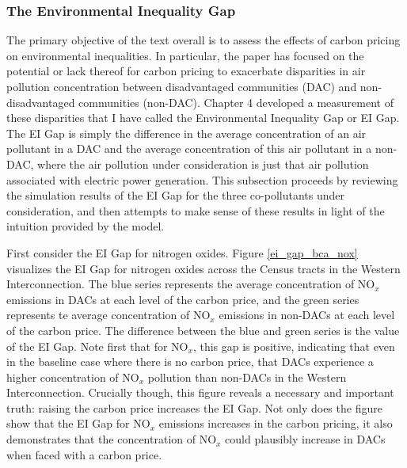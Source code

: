 



\subsubsection*{The Environmental Inequality Gap}

The primary objective of the text overall is to assess the effects of carbon pricing on environmental inequalities. In particular, the paper has focused on the potential or lack thereof for carbon pricing to exacerbate disparities in air pollution concentration between disadvantaged communities (DAC) and non-disadvantaged communities (non-DAC). Chapter 4 developed a measurement of these disparities that I have called the Environmental Inequality Gap or EI Gap. The EI Gap is simply the difference in the average concentration of an air pollutant in a DAC and the average concentration of this air pollutant in a non-DAC, where the air pollution under consideration is just that air pollution associated with electric power generation. This subsection proceeds by reviewing the simulation results of the EI Gap for the three co-pollutants under consideration, and then attempts to make sense of these results in light of the intuition provided by the model.

First consider the EI Gap for nitrogen oxides. Figure \ref{ei_gap_bca_nox} visualizes the EI Gap for nitrogen oxides across the Census tracts in the Western Interconnection. The blue series represents the average concentration of NO$_x$ emissions in DACs at each level of the carbon price, and the green series represents te average concentration of NO$_x$ emissions in non-DACs at each level of the carbon price. The difference between the blue and green series is the value of the EI Gap. Note first that for NO$_x$, this gap is positive, indicating that even in the baseline case where there is no carbon price, that DACs experience a higher concentration of NO$_x$ pollution than non-DACs in the Western Interconnection. Crucially though, this figure reveals a necessary and important truth: raising the carbon price increases the EI Gap. Not only does the figure show that the EI Gap for NO$_x$ emissions increases in the carbon pricing, it also demonstrates that the concentration of NO$_x$ could plausibly increase in DACs when faced with a carbon price. 

